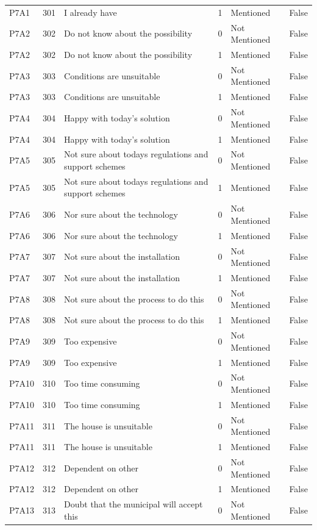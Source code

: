 \begin{tabular}{lrlllr}
P7A1 & 301 & I already have & 1 & Mentioned & False \\
P7A2 & 302 & Do not know about the possibility & 0 & Not Mentioned & False \\
P7A2 & 302 & Do not know about the possibility & 1 & Mentioned & False \\
P7A3 & 303 & Conditions are unsuitable & 0 & Not Mentioned & False \\
P7A3 & 303 & Conditions are unsuitable & 1 & Mentioned & False \\
P7A4 & 304 & Happy with today's solution & 0 & Not Mentioned & False \\
P7A4 & 304 & Happy with today's solution & 1 & Mentioned & False \\
P7A5 & 305 & Not sure about todays regulations and support schemes & 0 & Not Mentioned & False \\
P7A5 & 305 & Not sure about todays regulations and support schemes & 1 & Mentioned & False \\
P7A6 & 306 & Nor sure about the technology & 0 & Not Mentioned & False \\
P7A6 & 306 & Nor sure about the technology & 1 & Mentioned & False \\
P7A7 & 307 & Not sure about the installation & 0 & Not Mentioned & False \\
P7A7 & 307 & Not sure about the installation & 1 & Mentioned & False \\
P7A8 & 308 & Not sure about the process to do this & 0 & Not Mentioned & False \\
P7A8 & 308 & Not sure about the process to do this & 1 & Mentioned & False \\
P7A9 & 309 & Too expensive & 0 & Not Mentioned & False \\
P7A9 & 309 & Too expensive & 1 & Mentioned & False \\
P7A10 & 310 & Too time consuming & 0 & Not Mentioned & False \\
P7A10 & 310 & Too time consuming & 1 & Mentioned & False \\
P7A11 & 311 & The house is unsuitable & 0 & Not Mentioned & False \\
P7A11 & 311 & The house is unsuitable & 1 & Mentioned & False \\
P7A12 & 312 & Dependent on other & 0 & Not Mentioned & False \\
P7A12 & 312 & Dependent on other & 1 & Mentioned & False \\
P7A13 & 313 & Doubt that the municipal will accept this & 0 & Not Mentioned & False \\

\end{tabular}
